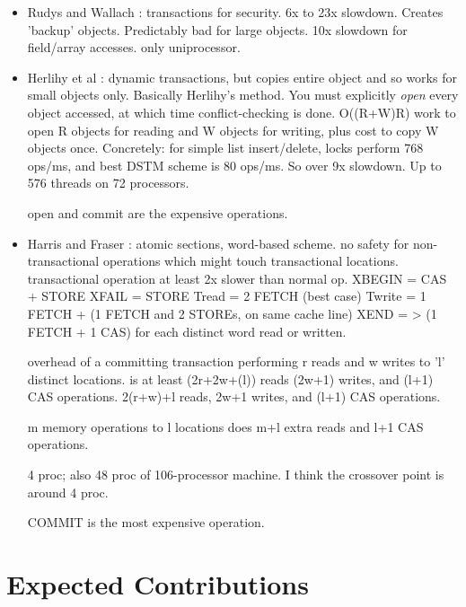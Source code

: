 \documentclass[12pt,oneside]{article}
\begin{document}
{\begin{itemize}
  64 processors; no numbers presented for less than 10 processors.

  acquire/release/agree are expensive.

\item Rudys and Wallach \cite{RudysWa02}: transactions for security.
  6x to 23x slowdown.  Creates 'backup' objects.  Predictably bad
  for large objects.  10x slowdown for field/array accesses.
  only uniprocessor.

\item Herlihy et al \cite{HerlihyLuMoSc03}: dynamic transactions, but
  copies entire object and so works for small objects only.  Basically
  Herlihy's method.  You must explicitly \emph{open} every object
  accessed, at which time conflict-checking is done.
  O((R+W)R) work to open R objects for reading and W objects for
  writing, plus cost to copy W objects once.  Concretely: for simple
  list insert/delete, locks perform 768 ops/ms, and best DSTM scheme
  is 80 ops/ms.   So over 9x slowdown.
  Up to 576 threads on 72 processors.

  open and commit are the expensive operations.
\item Harris and Fraser \cite{HarrisFr03}: atomic sections, word-based
  scheme.  no safety for non-transactional operations which might
  touch transactional locations.  transactional operation at least 2x
  slower than normal op.
  XBEGIN = CAS + STORE
  XFAIL = STORE
  Tread = 2 FETCH (best case)
  Twrite = 1 FETCH + (1 FETCH and 2 STOREs, on same cache line)
  XEND = > (1 FETCH + 1 CAS) for each distinct word read or written.

  overhead of a committing transaction performing r reads and w writes
  to 'l' distinct locations.
  is at least (2r+2w+(l)) reads (2w+1) writes, and (l+1) CAS
  operations.  2(r+w)+l reads, 2w+1 writes, and (l+1) CAS operations.

m memory operations to l locations does m+l extra reads and l+1 CAS operations.

  4 proc; also 48 proc of 106-processor machine.  I think the
  crossover point is around 4 proc.

  COMMIT is the most expensive operation.
\end{itemize}
}


\section{Expected Contributions}
\end{document}
